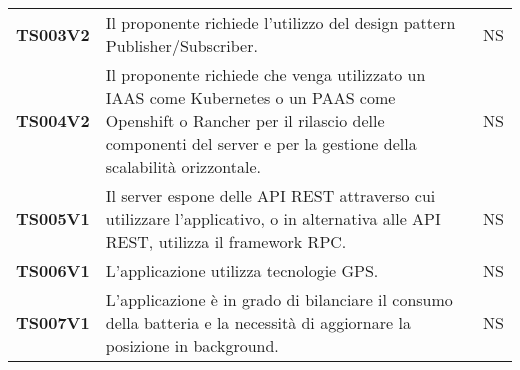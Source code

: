 \documentclass[../piano-di-qualifica.tex]{subfiles}
\begin{document}
\begin{centering}
\begin{longtable}[H]{>{\centering\bfseries}m{3cm} >{}p{10cm} >{\centering\arraybackslash}m{3cm}}
    TS003V2            & Il proponente richiede l’utilizzo del design pattern Publisher/Subscriber. \newline
                       & NS                                                                                                                                                                                                                                                               \\

    TS004V2            & Il proponente richiede che venga utilizzato un IAAS come Kubernetes o un PAAS come Openshift o Rancher per il rilascio delle componenti del server e per la gestione della scalabilità orizzontale. \newline
                       & NS                                                                                                                                                                                                                                                               \\

    TS005V1            & Il server espone delle API REST attraverso cui utilizzare l’applicativo, o in alternativa alle API REST, utilizza il framework RPC\@. \newline
                       & NS                                                                                                                                                                                                                                                               \\

    TS006V1            & L’applicazione utilizza tecnologie GPS\@. \newline
                       & NS                                                                                                                                                                                                                                                               \\

    TS007V1            & L’applicazione è in grado di bilanciare il consumo della batteria e la necessità di aggiornare la posizione in background. \newline
                       & NS                                                                                                                                                                                                                                                               \\


\end{longtable}
\end{centering}
\end{document}
